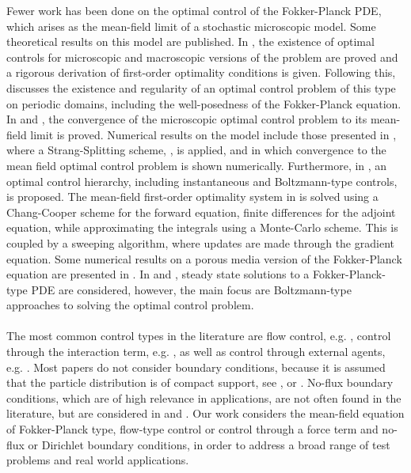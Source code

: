 \documentclass[11pt, a4paper]{article}
\theoremstyle{definition}
\begin{document}
Fewer work has been done on the optimal control of the Fokker-Planck PDE, which arises as the mean-field limit of a stochastic microscopic model. Some theoretical results on this model are published. In \cite{albi2016mean}, the existence of optimal controls for microscopic and macroscopic versions of the problem are proved and a rigorous derivation of first-order optimality conditions is given. 
Following this, \cite{carrillo2019mean} discusses the existence and regularity of an optimal control problem of this type on periodic domains, including the well-posedness of the Fokker-Planck equation. In \cite{Pinnau_2017} and  \cite{carrillo2018no1}, the convergence of the microscopic optimal control problem to its mean-field limit is proved.
Numerical results on the model include those presented in \cite{Pinnau_2017}, where a Strang-Splitting scheme, \cite{gilbertstrang1}, is applied, and in which convergence to the mean field optimal control problem is shown numerically. Furthermore, in \cite{albi2016mean}, an optimal control hierarchy, including instantaneous and Boltzmann-type controls, is proposed. The mean-field first-order optimality system in \cite{albi2016mean} is solved using a Chang-Cooper scheme for the forward equation, finite differences for the adjoint equation, while approximating the integrals using a Monte-Carlo scheme. This is coupled by a sweeping algorithm, where updates are made through the gradient equation.
Some numerical results on a porous media version of the Fokker-Planck equation are presented in \cite{carrillo2018no1}. In \cite{Albi_2014no1} and \cite{albi2014kinetic}, steady state solutions to a Fokker-Planck-type PDE are considered, however, the main focus  are Boltzmann-type approaches to solving the optimal control problem.
\\
\\
The most common control types in the literature are flow control, e.g. \cite{albi2016mean}, control through the interaction term, e.g. \cite{Pinnau_2017}, as well as control through external agents, e.g. \cite{Fornasier_2014no2}. 
Most papers do not consider boundary conditions, because it is assumed that the particle distribution is of compact support, see \cite{burger2019meanfield}, \cite{fornasier_lisini_orrieri_savare_2019} or \cite{burger2016controlling}. No-flux boundary conditions, which are of high relevance in applications, are not often found in the literature, but are considered in \cite{albi2016mean} and \cite{carrillo2018no1}.
Our work considers the mean-field equation of Fokker-Planck type, flow-type control or control through a force term and no-flux or Dirichlet boundary conditions, in order to address a broad range of test problems and real world applications. 
\end{document}
